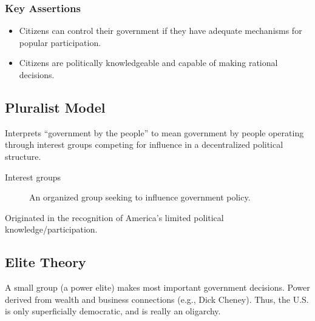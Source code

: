 \subsubsection{Key Assertions}
\begin{itemize}
    \item Citizens can control their government if they have adequate mechanisms for popular participation.
    \item Citizens are politically knowledgeable and capable of making rational decisions.
\end{itemize}

\subsection{Pluralist Model}
Interprets ``government by the people'' to mean government by people operating through interest groups competing for influence in a decentralized political structure.
\begin{description}
    \item[Interest groups] An organized group seeking to influence government policy.
\end{description}
Originated in the recognition of America's limited political knowledge/participation.

\subsection{Elite Theory}
A small group (a power elite) makes most important government decisions. Power derived from wealth and business connections (e.g., Dick Cheney). Thus, the U.S. is only superficially democratic, and is really an oligarchy.